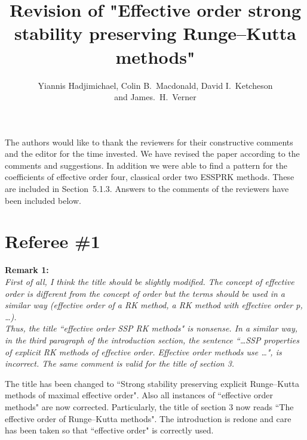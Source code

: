 \documentclass[12pt]{article}
\newcommand{\remark}[2]{\vspace{25pt} \noindent \textbf{Remark #1:\newline} \textit{#2}\vspace{15pt}}
\renewcommand{\newline}{\vspace{15pt}\\}
\newcommand{\david}[1]{\textcolor{red}{\\\textbf{D: \footnotesize #1}\\}}
\newcommand{\yiannis}[1]{\textcolor{OliveGreen}{\\\textbf{Y: \footnotesize #1}\\}}
\begin{document}
\title{Revision of "Effective order strong stability preserving Runge--Kutta methods"}
\author{Yiannis Hadjimichael, Colin B.~Macdonald, David I.~Ketcheson \\ and  James.~H.~Verner}

\maketitle

The authors would like to thank the reviewers for their constructive comments and the
editor for the time invested. 
We have revised the paper according to the comments and suggestions.
In addition we were able to find a pattern for the coefficients of effective order four, 
classical order two ESSPRK methods.
These are included in Section~5.1.3.
Answers to the comments of the reviewers have been included below.
\vspace{30pt}

\section*{Referee \#1}
\remark{1}
{First of all, I think the title should be slightly modified. 
The concept of \textit{effective order} is different from the concept of \textit{order} 
but the terms should be used in a similar way (\textit{effective order of a RK method, 
a RK method with effective order p, \dots}).
\newline
Thus, the title ``effective order SSP RK methods" is nonsense.
In a similar way, in the third paragraph of the introduction section, the sentence 
``\dots SSP properties of explicit RK methods of effective order. Effective order 
methods use \dots", is incorrect.
The same comment is valid for the title of section 3.}

The title has been changed to ``Strong stability preserving explicit Runge--Kutta methods of maximal effective order". 
Also all instances of ``effective order methods" are now corrected.
Particularly, the title of section 3 now reads ``The effective order of Runge--Kutta 
methods". %
The introduction is redone and care has been taken so that ``effective order" 
is correctly used.

%
\end{document}
